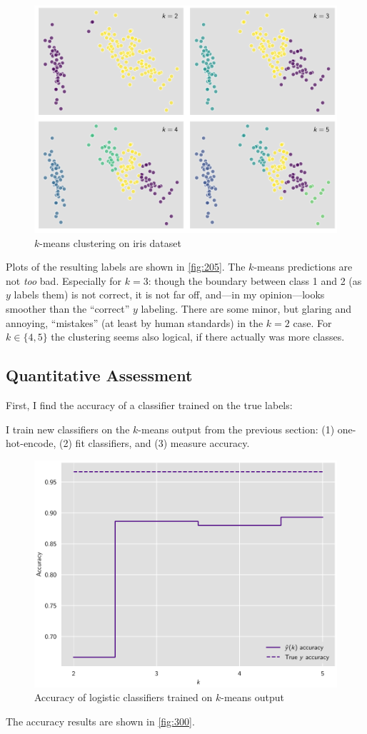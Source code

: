 \documentclass[british]{article}
\begin{document}
\begin{figure}
  \centering
  \includegraphics[width=0.9\columnwidth]{fig/205.pdf}
  \caption{$k$-means clustering on iris dataset}
  \label{fig:205}
\end{figure}

Plots of the resulting labels are shown in \autoref{fig:205}. The $k$-means
predictions are not \emph{too} bad. Especially for $k=3$: though the boundary
between class 1 and 2 (as $y$ labels them) is not correct, it is not far off,
and---in my opinion---looks smoother than the \enquote{correct} $y$ labeling.
There are some minor, but glaring and annoying, \enquote{mistakes} (at least by
human standards) in the $k=2$ case. For $k \in \{4, 5\}$ the clustering seems
also logical, if there actually was more classes.

\subsection{Quantitative Assessment}

First, I find the accuracy of a classifier trained on the true labels:


I train new classifiers on the $k$-means output from the previous section: (1)
one-hot-encode, (2) fit classifiers, and (3) measure accuracy.


\begin{figure}
  \centering
  \includegraphics[width=0.9\columnwidth]{fig/300.pdf}
  \caption{Accuracy of logistic classifiers trained on $k$-means output}
  \label{fig:300}
\end{figure}

The accuracy results are shown in \autoref{fig:300}.

\printbibliography
\end{document}
